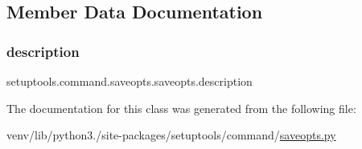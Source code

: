 \subsection{Member Data Documentation}
\mbox{\label{classsetuptools_1_1command_1_1saveopts_1_1saveopts_af78e92ede2fea32591d26970188c9fd9}} 
\subsubsection{\texorpdfstring{description}{description}}
{\footnotesize\ttfamily setuptools.\+command.\+saveopts.\+saveopts.\+description\hspace{0.3cm}{\ttfamily [static]}}



The documentation for this class was generated from the following file\+:\begin{DoxyCompactItemize}
\item 
venv/lib/python3./site-\/packages/setuptools/command/\hyperlink{saveopts_8py}{saveopts.\+py}\end{DoxyCompactItemize}
